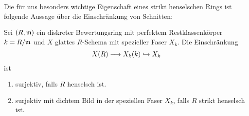 \documentclass[german, bibliography=totoc]{scrreprt}
\begin{document}
Die für uns besonders wichtige Eigenschaft eines strikt henselschen
Rings ist folgende Aussage über die Einschränkung von Schnitten:
\begin{Satz}
  \label{thm:eigstrikthenselsch}
  Sei $(R,\mathfrak{m})$ ein diskreter Bewertungsring mit perfektem
  Restklassenkörper $k=R/\mathfrak{m}$ und $X$ glattes $R$-Schema mit spezieller
  Faser $X_k$.
  Die Einschränkung
  \begin{gather*}
    X(R)\longrightarrow X_k(k)\hookrightarrow X_k
  \end{gather*}
  ist
  \begin{enumerate}[label=(\roman*)]
  \item surjektiv, falls $R$ henselsch ist.
  \item surjektiv mit dichtem Bild in der speziellen Faser $X_k$,
    falls $R$ strikt henselsch ist.
  \end{enumerate}
\end{Satz}
\end{document}
